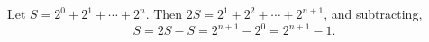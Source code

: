 Let $S=2^0+2^1+\cdots+2^n$. Then $2S=2^1+2^2+\cdots+2^{n+1}$, and subtracting,
\[S=2S-S=2^{n+1}-2^0=\boxed{2^{n+1}-1}.\]
